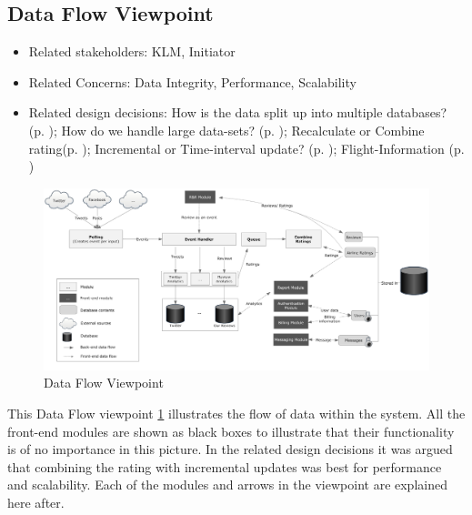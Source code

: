 % 

\subsection{Data Flow Viewpoint}

\begin{itemize}
\item Related stakeholders: KLM, Initiator
\item Related Concerns: Data Integrity, Performance, Scalability
\item Related design decisions: How is the data split up into multiple databases? (p. \pageref{dd:split}); How do we handle large data-sets? 
(p. \pageref{dd:large-data}); Recalculate or Combine rating(p. \pageref{dd:recalc-comb}); Incremental or Time-interval update? (p. \pageref{dd:inc-or-time}); Flight-Information (p. \pageref{dd:flight-inf})
\end{itemize}

\newpage
\begin{landscape}
\begin{figure}
\includegraphics[width=600px]{DataFloow}
\caption{Data Flow Viewpoint}
\label{fig:Data Flow}
\end{figure}
\end{landscape}

This Data Flow viewpoint \ref{fig:Data Flow} illustrates the flow of data within the system. All the front-end modules are shown as black boxes to illustrate that their functionality is of no importance in this picture.
In the related design decisions it was argued that combining the rating with incremental updates was best for performance and scalability.  Each of the modules and arrows in the viewpoint are explained here after.

